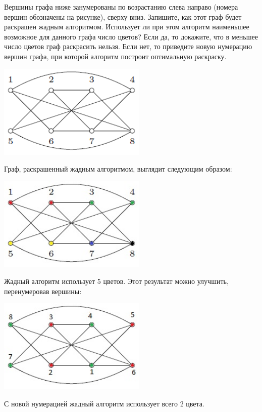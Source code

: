 \begin{task}{62}
Вершины графа ниже занумерованы по возрастанию слева направо (номера вершин обозначены на рисунке), сверху вниз. Запишите, как этот граф будет раскрашен жадным алгоритмом. Использует ли при этом алгоритм наименьшее возможное для данного графа число цветов? Если да, то докажите, что в меньшее число цветов граф раскрасить нельзя. Если нет, то приведите новую нумерацию вершин графа, при которой алгоритм построит оптимальную раскраску.

\includegraphics[width = 200pt]{img/id62.png}
\end{task}
\begin{solution}
Граф, раскрашенный жадным алгоритмом, выглядит следующим образом:

\includegraphics[width = 200pt]{img/id62_greedy.jpg}

Жадный алгоритм использует 5 цветов. Этот результат можно улучшить, перенумеровав вершины:

\includegraphics[width = 200pt]{img/id62_optimal.jpg}

С новой нумерацией жадный алгоритм использует всего 2 цвета.
\end{solution}
